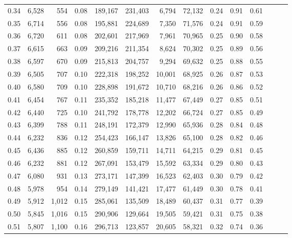 \begin{tabular}{rrrrrrrrrrrrrr}
0.34 &   6,528 &    554 &  0.08 &  189,167 &  231,403 &   6,794 &  72,132 &  0.24 &  0.91 &      0.61 \\
0.35 &   6,714 &    556 &  0.08 &  195,881 &  224,689 &   7,350 &  71,576 &  0.24 &  0.91 &      0.59 \\
0.36 &   6,720 &    611 &  0.08 &  202,601 &  217,969 &   7,961 &  70,965 &  0.25 &  0.90 &      0.58 \\
0.37 &   6,615 &    663 &  0.09 &  209,216 &  211,354 &   8,624 &  70,302 &  0.25 &  0.89 &      0.56 \\
0.38 &   6,597 &    670 &  0.09 &  215,813 &  204,757 &   9,294 &  69,632 &  0.25 &  0.88 &      0.55 \\
0.39 &   6,505 &    707 &  0.10 &  222,318 &  198,252 &  10,001 &  68,925 &  0.26 &  0.87 &      0.53 \\
0.40 &   6,580 &    709 &  0.10 &  228,898 &  191,672 &  10,710 &  68,216 &  0.26 &  0.86 &      0.52 \\
0.41 &   6,454 &    767 &  0.11 &  235,352 &  185,218 &  11,477 &  67,449 &  0.27 &  0.85 &      0.51 \\
0.42 &   6,440 &    725 &  0.10 &  241,792 &  178,778 &  12,202 &  66,724 &  0.27 &  0.85 &      0.49 \\
0.43 &   6,399 &    788 &  0.11 &  248,191 &  172,379 &  12,990 &  65,936 &  0.28 &  0.84 &      0.48 \\
0.44 &   6,232 &    836 &  0.12 &  254,423 &  166,147 &  13,826 &  65,100 &  0.28 &  0.82 &      0.46 \\
0.45 &   6,436 &    885 &  0.12 &  260,859 &  159,711 &  14,711 &  64,215 &  0.29 &  0.81 &      0.45 \\
0.46 &   6,232 &    881 &  0.12 &  267,091 &  153,479 &  15,592 &  63,334 &  0.29 &  0.80 &      0.43 \\
0.47 &   6,080 &    931 &  0.13 &  273,171 &  147,399 &  16,523 &  62,403 &  0.30 &  0.79 &      0.42 \\
0.48 &   5,978 &    954 &  0.14 &  279,149 &  141,421 &  17,477 &  61,449 &  0.30 &  0.78 &      0.41 \\
0.49 &   5,912 &  1,012 &  0.15 &  285,061 &  135,509 &  18,489 &  60,437 &  0.31 &  0.77 &      0.39 \\
0.50 &   5,845 &  1,016 &  0.15 &  290,906 &  129,664 &  19,505 &  59,421 &  0.31 &  0.75 &      0.38 \\
0.51 &   5,807 &  1,100 &  0.16 &  296,713 &  123,857 &  20,605 &  58,321 &  0.32 &  0.74 &      0.36 \\

\end{tabular}
